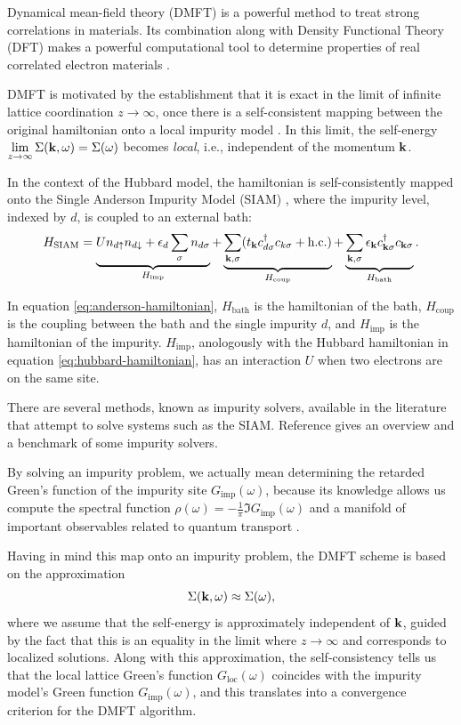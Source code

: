 \documentclass[12pt]{report}
\begin{document}
Dynamical mean-field theory (DMFT) is a powerful method to treat strong correlations in materials. Its combination along with Density Functional Theory (DFT) makes a powerful computational tool to determine properties of real correlated electron materials \cite{hauleweb, haule_real_materials}.

DMFT is motivated by the establishment that it is exact in the limit of infinite lattice coordination $z \to \infty$, once there is a self-consistent mapping between the original hamiltonian onto a local impurity model \cite{thesis_dmft_graz}. In this limit, the self-energy $\displaystyle{\lim_{z \to \infty}\Sigma({\vb{k}},\omega) = \Sigma(\omega)}$ becomes \textit{local}, i.e., independent of the momentum ${\vb{k}}$.

In the context of the Hubbard model, the hamiltonian is self-consistently mapped onto the Single Anderson Impurity Model (SIAM) \cite{impurity-solvers, georges1996}, where the impurity level, indexed by $d$, is coupled to an external bath:
\begin{equation} \label{eq:anderson-hamiltonian}
H_{\text{SIAM}} = \underbrace{U n_{d{\uparrow}} n_{d{\downarrow}} + \epsilon_d \sum_{{\sigma}} n_{d{\sigma}}}_{H_{\text{imp}}}
+ \underbrace{\sum_{{\vb{k}},{\sigma}} (t_{\vb{k}} c_{d{\sigma}}^\dagger c_{k{\sigma}} + {\text{h.c.}})}_{H_{\text{coup}}}
+ \underbrace{\sum_{{\vb{k}},{\sigma}} \epsilon_{\vb{k}} c_{{\vb{k}}{\sigma}}^\dagger c_{{\vb{k}}{\sigma}}}_{H_{\text{bath}}}.
\end{equation}

In equation \ref{eq:anderson-hamiltonian}, $H_{\text{bath}}$ is the hamiltonian of the bath, $H_{\text{coup}}$ is the coupling between the bath and the single impurity $d$, and $H_{\text{imp}}$ is the hamiltonian of the impurity. $H_{\text{imp}}$, anologously with the Hubbard hamiltonian in equation \ref{eq:hubbard-hamiltonian}, has an interaction $U$ when two electrons are on the same site.

There are several methods, known as impurity solvers, available in the literature that attempt to solve systems such as the SIAM. Reference \cite{impurity-solvers} gives an overview and a benchmark of some impurity solvers.

By solving an impurity problem, we actually mean determining the retarded Green's function of the impurity site $G_{\text{imp}}(\omega)$, because its knowledge allows us compute the spectral function $\displaystyle{\rho(\omega) = - \frac{1}{\pi} \Im{G_{\text{imp}}(\omega)}}$ \cite{bruus} and a manifold of important observables related to quantum transport \cite{pedagogical-gfs}.

Having in mind this map onto an impurity problem, the DMFT scheme is based on the approximation
\begin{equation} \label{eq:dmft-approx}
\Sigma({\vb{k}}, \omega) \approx \Sigma(\omega),
\end{equation}
where we assume that the self-energy is approximately independent of ${\vb{k}}$, guided by the fact that this is an equality in the limit where $z \to \infty$ and corresponds to localized solutions. Along with this approximation, the self-consistency tells us that the local lattice Green's function $G_{\text{loc}}(\omega)$ coincides with the impurity model's Green function $G_{\text{imp}}(\omega)$, and this translates into a convergence criterion for the DMFT algorithm.
\end{document}
